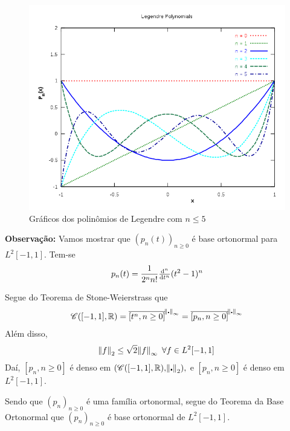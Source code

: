 \documentclass[11pt,a4paper]{article}
\begin{document}
{ \begin{figure}
     \includegraphics[scale=0.6]{figuras/legendre.png}
     \caption{Gráficos dos polinômios de Legendre com $n \le 5$}
 \end{figure}

\bigskip
\noindent
 \textbf{Observação:} Vamos mostrar que $(p_n(t))_{n \ge 0}$ é base ortonormal para $L^2[-1,1].$ Tem-se
 \[
 p_n(t) = \frac{1}{2^n n!} \od[n]{}{t} (t^2 - 1)^n
 \]
 
 Segue do Teorema de Stone-Weierstrass que
 \[
 \mathcal{C}([-1,1], \mathbb{R}) = \overline{[t^n, n \ge 0 ]}^{\norm{\centerdot}_\infty} = \overline{[p_n , n \ge 0]}^{\norm{\centerdot}_\infty}
 \]
 Além disso,
 \[
 \norm{f}_2 \le \sqrt{2} \norm{f}_\infty \ \forall f \in L^2[-1,1] 
 \]
 Daí, $[p_n, n \ge 0]$ é denso em $(\mathcal{C}([-1,1], \mathbb{R}), \norm{\centerdot}_2),$ e $[p_n, n \ge 0]$ é denso em $L^2[-1,1].$

\medskip
\noindent
Sendo que $(p_n)_{n \ge 0}$ é uma família ortonormal, segue do Teorema da Base Ortonormal que $(p_n)_{n \ge 0}$ é base ortonormal de $L^2[-1,1].$
}

\newpage
\end{document}
